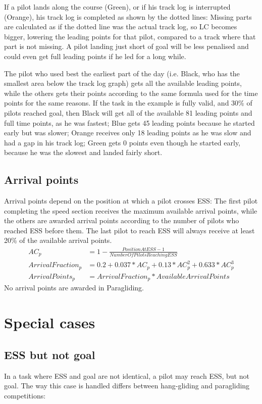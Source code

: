 \documentclass{article}
\begin{document}
If a pilot lands along the course (Green), or if his track log is interrupted
(Orange), his track log is completed as shown by the dotted lines: Missing
parts are calculated as if the dotted line was the actual track log, so LC
becomes bigger, lowering the leading points for that pilot, compared to a track
where that part is not missing. A pilot landing just short of goal will be less
penalised and could even get full leading points if he led for a long while.

The pilot who used best the earliest part of the day (i.e. Black, who has the
smallest area below the track log graph) gets all the available leading points,
while the others gets their points according to the same formula used for the
time points for the same reasons. If the task in the example is fully valid,
and 30\% of pilots reached goal, then Black will get all of the available 81
leading points and full time points, as he was fastest; Blue gets 45 leading
points because he started early but was slower; Orange receives only 18 leading
points as he was slow and had a gap in his track log; Green gets 0 points even
though he started early, because he was the slowest and landed fairly short.

\subsection{Arrival points}
Arrival points depend on the position at which a pilot crosses ESS: The first
pilot completing the speed section receives the maximum available arrival
points, while the others are awarded arrival points according to the number of
pilots who reached ESS before them. The last pilot to reach ESS will always
receive at least 20\% of the available arrival points.
\begin{align*}
    AC_p &= 1 - \frac{PositionAtESS - 1}{NumberOfPilotsReachingESS} \\
    ArrivalFraction_p &= 0.2 + 0.037 * AC_p + 0.13 * AC_p^2 + 0.633 * AC_p^3 \\
    ArrivalPoints_p &= ArrivalFraction_p * AvailableArrivalPoints
\end{align*}
No arrival points are awarded in Paragliding.

\newpage
\section{Special cases}
\subsection{ESS but not goal}
In a task where ESS and goal are not identical, a pilot may reach ESS, but not
goal. The way this case is handled differs between hang-gliding and paragliding
competitions:
\end{document}
